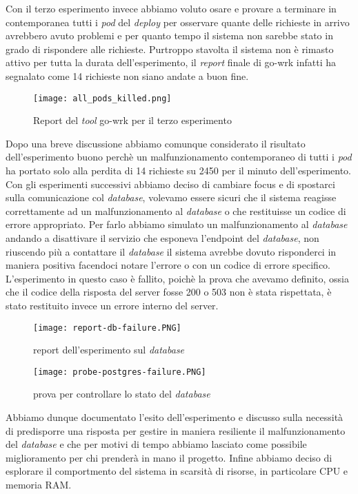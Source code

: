 Con il terzo esperimento invece abbiamo voluto osare e provare a terminare in contemporanea tutti i \textit{pod} del \textit{deploy} per osservare quante delle richieste in arrivo avrebbero avuto problemi e per quanto tempo il sistema non sarebbe stato in grado di rispondere alle richieste.
Purtroppo stavolta il sistema non è rimasto attivo per tutta la durata dell'esperimento, il \textit{report} finale di go-wrk infatti ha segnalato come 14 richieste non siano andate a buon fine.
\begin{figure}[h]
    \centering
    \texttt{[image: all\_pods\_killed.png]}
    \caption{Report del \textit{tool} go-wrk per il terzo esperimento}
    \label{tab:report-all-pods-killed}
\end{figure}
Dopo una breve discussione abbiamo comunque considerato il risultato dell'esperimento buono perchè un malfunzionamento contemporaneo di tutti i \textit{pod} ha portato solo alla perdita di 14 richieste su 2450 per il minuto dell'esperimento.
Con gli esperimenti successivi abbiamo deciso di cambiare focus e di spostarci sulla comunicazione col \textit{database}, volevamo essere sicuri che il sistema reagisse correttamente ad un malfunzionamento al \textit{database} o che restituisse un codice di errore appropriato.
Per farlo abbiamo simulato un malfunzionamento al \textit{database} andando a disattivare il servizio che esponeva l'endpoint del \textit{database}, non riuscendo più a contattare il \textit{database} il sistema avrebbe dovuto risponderci in maniera positiva facendoci notare l'errore o con un codice di errore specifico.
L'esperimento in questo caso è fallito, poichè la prova che avevamo definito, ossia che il codice della risposta del server fosse 200 o 503 non è stata rispettata, è stato restituito invece un errore interno del server.
\begin{figure}[H]
    \centering
    \texttt{[image: report-db-failure.PNG]}
    \caption{report dell'esperimento sul \textit{database}}
    \label{tab:report-database-experiment}
\end{figure}
\begin{figure}[H]
    \centering
    \texttt{[image: probe-postgres-failure.PNG]}
    \caption{prova per controllare lo stato del \textit{database}}
    \label{tab:report-database-experiment}
\end{figure}

Abbiamo dunque documentato l'esito dell'esperimento e discusso sulla necessità di predisporre una risposta per gestire in maniera resiliente il malfunzionamento del \textit{database} e che per motivi di tempo abbiamo lasciato come possibile miglioramento per chi prenderà in mano il progetto.
Infine abbiamo deciso di esplorare il comportmento del sistema in scarsità di risorse, in particolare CPU e memoria RAM.

